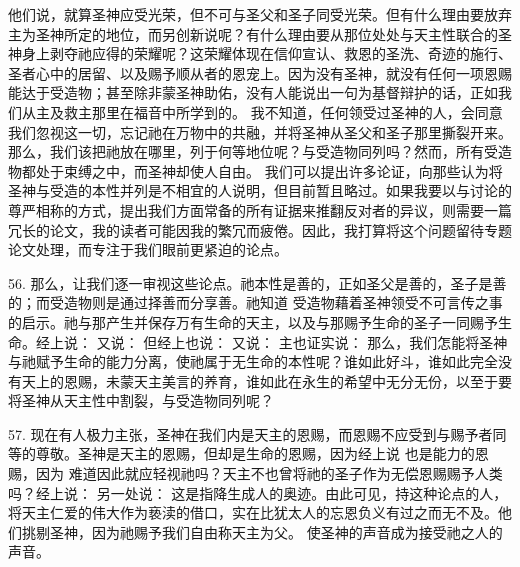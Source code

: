 他们说，就算圣神应受光荣，但不可与圣父和圣子同受光荣。但有什么理由要放弃主为圣神所定的地位，而另创新说呢？有什么理由要从那位处处与天主性联合的圣神身上剥夺祂应得的荣耀呢？这荣耀体现在信仰宣认、救恩的圣洗、奇迹的施行、圣者心中的居留、以及赐予顺从者的恩宠上。因为没有圣神，就没有任何一项恩赐能达于受造物；甚至除非蒙圣神助佑，没有人能说出一句为基督辩护的话，正如我们从主及救主那里在福音中所学到的。 我不知道，任何领受过圣神的人，会同意我们忽视这一切，忘记祂在万物中的共融，并将圣神从圣父和圣子那里撕裂开来。那么，我们该把祂放在哪里，列于何等地位呢？与受造物同列吗？然而，所有受造物都处于束缚之中，而圣神却使人自由。 我们可以提出许多论证，向那些认为将圣神与受造的本性并列是不相宜的人说明，但目前暂且略过。如果我要以与讨论的尊严相称的方式，提出我们方面常备的所有证据来推翻反对者的异议，则需要一篇冗长的论文，我的读者可能因我的繁冗而疲倦。因此，我打算将这个问题留待专题论文处理，而专注于我们眼前更紧迫的论点。\par

56. 那么，让我们逐一审视这些论点。祂本性是善的，正如圣父是善的，圣子是善的；而受造物则是通过择善而分享善。祂知道 受造物藉着圣神领受不可言传之事的启示。祂与那产生并保存万有生命的天主，以及与那赐予生命的圣子一同赐予生命。经上说： 又说： 但经上也说： 又说： 主也证实说： 那么，我们怎能将圣神与祂赋予生命的能力分离，使祂属于无生命的本性呢？谁如此好斗，谁如此完全没有天上的恩赐，未蒙天主美言的养育，谁如此在永生的希望中无分无份，以至于要将圣神从天主性中割裂，与受造物同列呢？\par

57. 现在有人极力主张，圣神在我们内是天主的恩赐，而恩赐不应受到与赐予者同等的尊敬。圣神是天主的恩赐，但却是生命的恩赐，因为经上说 也是能力的恩赐，因为 难道因此就应轻视祂吗？天主不也曾将祂的圣子作为无偿恩赐赐予人类吗？经上说： 另一处说： 这是指降生成人的奥迹。由此可见，持这种论点的人，将天主仁爱的伟大作为亵渎的借口，实在比犹太人的忘恩负义有过之而无不及。他们挑剔圣神，因为祂赐予我们自由称天主为父。 使圣神的声音成为接受祂之人的声音。\par

